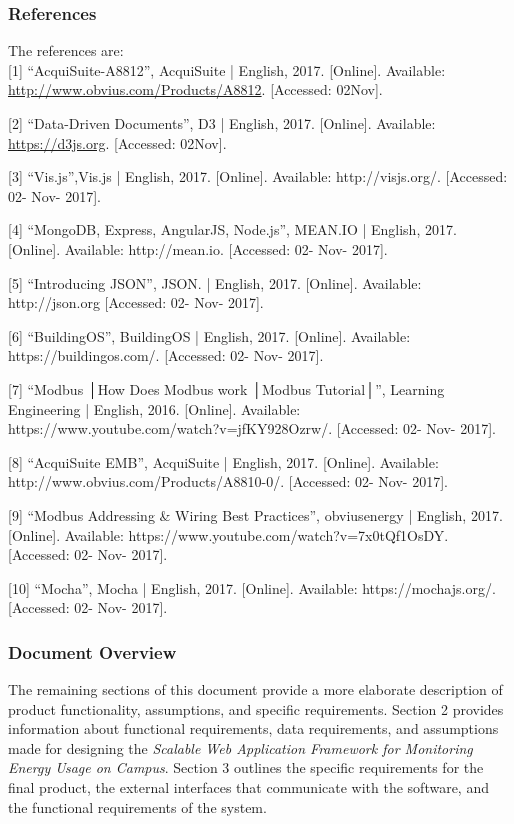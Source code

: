    \subsubsection{References} 
    The references are: \\

    \tiny
    [1] ``AcquiSuite-A8812'', AcquiSuite | English, 2017. [Online]. Available: \url{http://www.obvius.com/Products/A8812}. [Accessed: 02\-Nov].

    [2] ``Data-Driven Documents'', D3 | English, 2017. [Online]. Available:  \url{https://d3js.org}. [Accessed: 02\-Nov].

    [3] ``Vis.js'',Vis.js | English, 2017. [Online]. Available: http://visjs.org/. [Accessed: 02- Nov- 2017].

    [4] ``MongoDB, Express, AngularJS, Node.js'', MEAN.IO | English, 2017. [Online]. Available: http://mean.io. [Accessed: 02- Nov- 2017].

    [5] ``Introducing JSON'', JSON. | English, 2017. [Online]. Available: http://json.org [Accessed: 02- Nov- 2017].

    [6] ``BuildingOS'', BuildingOS | English, 2017. [Online]. Available: https://buildingos.com/. [Accessed: 02- Nov- 2017].

    [7] ``Modbus │How Does Modbus work │Modbus Tutorial│'', Learning Engineering | English, 2016. [Online]. Available: https://www.youtube.com/watch?v=jfKY928Ozrw/. [Accessed: 02- Nov- 2017].

    [8] ``AcquiSuite EMB'', AcquiSuite | English, 2017. [Online]. Available: http://www.obvius.com/Products/A8810-0/. [Accessed: 02- Nov- 2017].

    [9] ``Modbus Addressing \& Wiring Best Practices'', obviusenergy | English, 2017. [Online]. Available: https://www.youtube.com/watch?v=7x0tQf1OsDY. [Accessed: 02- Nov- 2017].

    [10] ``Mocha'', Mocha | English, 2017. [Online]. Available: https://mochajs.org/. [Accessed: 02- Nov- 2017].

    \normalsize
    \subsubsection{Document Overview}
	The remaining sections of this document provide a more elaborate description of product functionality, assumptions, and specific requirements. Section 2 provides information about functional requirements, data requirements, and assumptions made for designing the \textit{Scalable Web Application Framework for Monitoring Energy Usage on Campus}. Section 3 outlines the specific requirements for the final product, the external interfaces that communicate with the software, and the functional requirements of the system.
	
